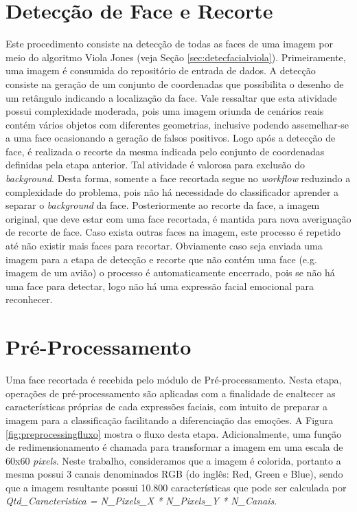 \section{Detecção de Face e Recorte}\label{sec:detect}
Este procedimento consiste na detecção de todas as faces de uma imagem por meio do algoritmo Viola Jones (veja Seção \ref{sec:detecfacialviola}). Primeiramente, uma imagem é consumida do repositório de entrada de dados. A detecção consiste na geração de um conjunto de coordenadas que possibilita o desenho de um retângulo indicando a localização da face. Vale ressaltar que esta atividade possui complexidade moderada, pois uma imagem oriunda de cenários reais contém vários objetos com diferentes geometrias, inclusive podendo assemelhar-se a uma face ocasionando a geração de falsos positivos. Logo após a detecção de face, é realizada o recorte da mesma indicada pelo conjunto de coordenadas definidas pela etapa anterior. Tal atividade é valorosa para exclusão do \textit{background}. Desta forma, somente a face recortada segue no \textit{workflow} reduzindo a complexidade do problema, pois não há necessidade do classificador aprender a separar o \textit{background} da face. Posteriormente ao recorte da face, a imagem original, que deve estar com uma face recortada, é mantida para nova averiguação de recorte de face. Caso exista outras faces na imagem, este processo é repetido até não existir mais faces para recortar. Obviamente caso seja enviada uma imagem para a etapa de detecção e recorte que não contém uma face (e.g. imagem de um avião) o processo é automaticamente encerrado, pois se não há uma face para detectar, logo não há uma expressão facial emocional para reconhecer. 

\section{Pré-Processamento}\label{sec:preproc}
Uma face recortada é recebida pelo módulo de Pré-processamento. Nesta etapa, operações de pré-processamento são aplicadas com a finalidade de enaltecer as características próprias de cada expressões faciais, com intuito de preparar a imagem para a classificação facilitando a diferenciação das emoções. A Figura \ref{fig:preprocessingfluxo} mostra o fluxo desta etapa. Adicionalmente, uma função de redimensionamento é chamada para transformar a imagem em uma escala de 60x60 \textit{pixels}. Neste trabalho, consideramos que a imagem é colorida, portanto a mesma possui 3 canais denominados RGB (do inglês: Red, Green e Blue), sendo que a imagem resultante possui 10.800 características que pode ser calculada por \textit{Qtd_Caracteristica = N_Pixels_X * N_Pixels_Y * N_Canais}. 

